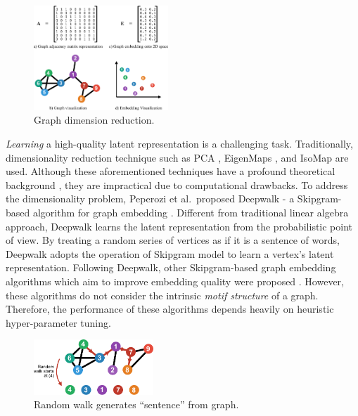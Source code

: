 \documentclass[letterpaper]{article}
\begin{document}
        \begin{figure}
            \centering
            \includegraphics[width=0.45\textwidth]{fig1_dimrec}
            \caption{Graph dimension reduction.}
            \label{fig:dimrec}
        \end{figure}

        \emph{Learning} a high-quality latent representation is a challenging task. Traditionally,
        dimensionality reduction technique such as PCA \cite{pca}, EigenMaps \cite{eigmaps}, and IsoMap 
        \cite{isomap} are used. Although these aforementioned techniques have a profound theoretical
        background \cite{dimrecrev}, they are impractical due to computational drawbacks. To address
        the dimensionality problem, Peperozi et al.\ proposed Deepwalk - a Skipgram-based algorithm
        for graph embedding \cite{deepwalk}. Different from traditional linear algebra approach,
        Deepwalk learns the latent representation from the probabilistic point of view. By treating
        a random series of vertices as if it is a sentence of words, Deepwalk adopts the operation
        of Skipgram model \cite{skipgram} to learn a vertex's latent representation. Following
        Deepwalk, other Skipgram-based graph embedding algorithms which aim to improve embedding
        quality were proposed \cite{grarep,line,planetoid,node2vec}. However, these algorithms
        do not consider the intrinsic \emph{motif structure} of a graph. Therefore, the performance
        of these algorithms depends heavily on heuristic hyper-parameter tuning.

        \begin{figure}
            \centering
            \includegraphics[width=0.4\textwidth]{fig2_congen}
            \caption{Random walk generates ``sentence'' from graph.}
            \label{fig:congen}
        \end{figure}
\end{document}
